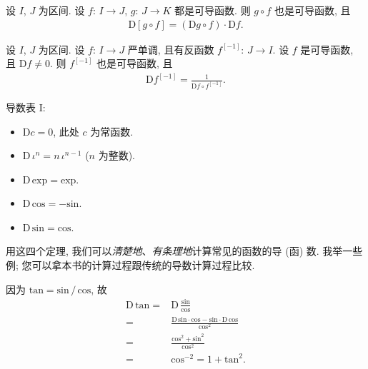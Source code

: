 \begin{theorem}
    设 $I$, $J$ 为区间. 设 $f$: $I \to J$, $g$: $J \to K$ 都是可导函数. 则 $g \circ f$ 也是可导函数, 且
    \begin{align*}
        \mathrm{D} [g \circ f] = (\mathrm{D}g \circ f) \cdot \mathrm{D}f.
    \end{align*}
\end{theorem}

\begin{theorem}
    设 $I$, $J$ 为区间. 设 $f$: $I \to J$ 严单调, 且有反函数 $f^{[-1]}$: $J \to I$. 设 $f$ 是可导函数, 且 $\mathrm{D}f \neq 0$. 则 $f^{[-1]}$ 也是可导函数, 且
    \begin{align*}
        \mathrm{D} f^{[-1]} = \frac{1}{\mathrm{D}f \circ f^{[-1]}}.
    \end{align*}
\end{theorem}

\begin{theorem}
    导数表 I:
    \begin{itemize}
        \item $\mathrm{D} c = 0$, 此处 $c$ 为常函数.
        \item $\mathrm{D}\, \iota^n = n \, \iota^{n - 1}$ ($n$ 为整数).
        \item $\mathrm{D}\, \mathrm{exp} = \mathrm{exp}$.
        \item $\mathrm{D}\, \mathrm{cos} = -\mathrm{sin}$.
        \item $\mathrm{D}\, \mathrm{sin} = \mathrm{cos}$.
    \end{itemize}
\end{theorem}

用这四个定理, 我们可以\emph{清楚地}、\emph{有条理地}计算常见的函数的导 (函) 数. 我举一些例; 您可以拿本书的计算过程跟传统的导数计算过程比较.

\begin{example}
    因为 $\mathrm{tan} = {\mathrm{sin}}\,/\,{\mathrm{cos}}$, 故
    \begin{align*}
        \mathrm{D}\, \mathrm{tan}
        = {} & \mathrm{D}\, \frac{\mathrm{sin}}{\mathrm{cos}}                                                                     \\
        = {} & \frac{\mathrm{D}\, \mathrm{sin} \cdot \mathrm{cos} - \mathrm{sin} \cdot \mathrm{D}\, \mathrm{cos}}{\mathrm{cos}^2} \\
        = {} & \frac{\mathrm{cos}^2 + \mathrm{sin}^2}{\mathrm{cos}^2}                                                             \\
        = {} & \mathrm{cos}^{-2} = 1 + \mathrm{tan}^2.
    \end{align*}
\end{example}

